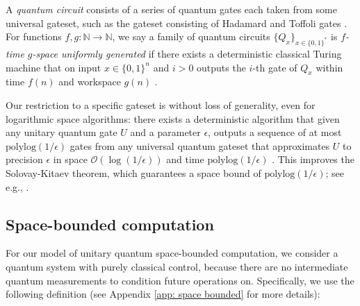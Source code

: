 \documentclass[11pt]{article}
\newtheorem{theorem}{Theorem}
\theoremstyle{definition}
\theoremstyle{remark}
\newcommand\bigoh{\mathcal{O}}
\newcommand{\polylog}{\textrm{polylog}}
\begin{document}
A \emph{quantum circuit} consists of a series of quantum gates each taken from some universal gateset, such as the gateset consisting of Hadamard and Toffoli gates \cite{shi}. %
 For functions $f,g:\mathbb{N}\rightarrow\mathbb{N}$, we say a family of quantum circuits $\{Q_x\}_{x\in\{0,1\}^*}$ is \emph{$f$-time $g$-space uniformly generated} if there exists a deterministic classical Turing machine that on input $x\in\{0,1\}^n$ and $i>0$ outputs the $i$-th gate of $Q_x$ within time $f(n)$ and workspace $g(n)$ \cite{nc00}.  
 
Our restriction to a specific gateset is without loss of generality, even for logarithmic space algorithms:  there exists a deterministic algorithm that given any unitary quantum gate $U$ and a parameter $\epsilon$, outputs a sequence of at most $\polylog({1/\epsilon})$ gates from any universal quantum gateset that approximates $U$ to precision $\epsilon$ in space $\bigoh({\log({1/\epsilon})})$ and time $\polylog({1/\epsilon})$ \cite{mw12}.  This improves the Solovay-Kitaev theorem, which guarantees a space bound of $\polylog(1/\epsilon)$; see e.g., \cite{nc00}.
\subsection{Space-bounded computation} \label{sec: space bounded computation}
For our model of unitary quantum space-bounded computation, we consider a quantum system with purely classical control, because there are no intermediate quantum measurements to condition future operations on. Specifically, we use the following definition (see Appendix \ref{app: space bounded} for more details):
\end{document}
